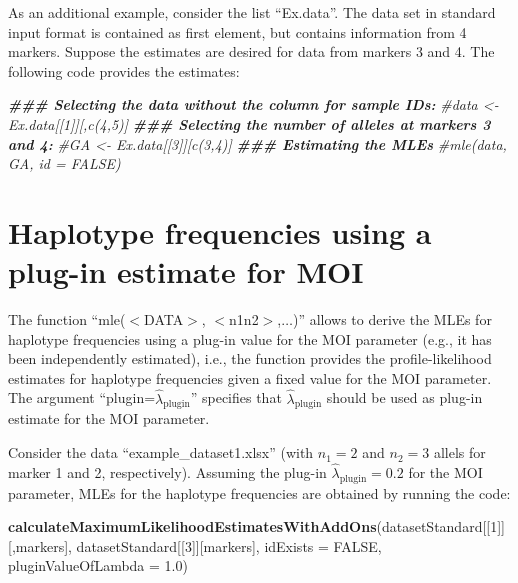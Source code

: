 \documentclass[
]{article}
\newenvironment{Shaded}{\begin{snugshade}}{\end{snugshade}}
\newcommand{\AttributeTok}[1]{\textcolor[rgb]{0.13,0.29,0.53}{#1}}
\newcommand{\CommentTok}[1]{\textcolor[rgb]{0.56,0.35,0.01}{\textit{#1}}}
\newcommand{\ConstantTok}[1]{\textcolor[rgb]{0.56,0.35,0.01}{#1}}
\newcommand{\DecValTok}[1]{\textcolor[rgb]{0.00,0.00,0.81}{#1}}
\newcommand{\DocumentationTok}[1]{\textcolor[rgb]{0.56,0.35,0.01}{\textbf{\textit{#1}}}}
\newcommand{\FloatTok}[1]{\textcolor[rgb]{0.00,0.00,0.81}{#1}}
\newcommand{\FunctionTok}[1]{\textcolor[rgb]{0.13,0.29,0.53}{\textbf{#1}}}
\newcommand{\NormalTok}[1]{#1}
\begin{document}
As an additional example, consider the list ``Ex.data''. The data set in
standard input format is contained as first element, but contains
information from 4 markers. Suppose the estimates are desired for data
from markers 3 and 4. The following code provides the estimates:

\begin{Shaded}
\begin{Highlighting}[]
\DocumentationTok{\#\#\# Selecting the data without the column for sample IDs:}
\CommentTok{\#data \textless{}{-} Ex.data[[1]][,c(4,5)]}
\DocumentationTok{\#\#\# Selecting the number of alleles at markers 3 and 4:}
\CommentTok{\#GA \textless{}{-} Ex.data[[3]][c(3,4)]}
\DocumentationTok{\#\#\# Estimating the MLEs}
\CommentTok{\#mle(data, GA, id = FALSE)}
\end{Highlighting}
\end{Shaded}

\section*{Haplotype frequencies using a plug-in estimate for MOI}

The function ``mle(\(<\)DATA\(>\), \(<\)n1n2\(>\),\(\ldots\))'' allows
to derive the MLEs for haplotype frequencies using a plug-in value for
the MOI parameter (e.g., it has been independently estimated), i.e., the
function provides the profile-likelihood estimates for haplotype
frequencies given a fixed value for the MOI parameter. The argument
``plugin=\(\hat \lambda_\text{plugin}\)'' specifies that
\(\hat \lambda_\text{plugin}\) should be used as plug-in estimate for
the MOI parameter.

Consider the data ``example\_dataset1.xlsx'' (with \(n_1=2\) and
\(n_2=3\) allels for marker 1 and 2, respectively). Assuming the plug-in
\(\hat \lambda_\text{plugin} = 0.2\) for the MOI parameter, MLEs for the
haplotype frequencies are obtained by running the code:

\begin{Shaded}
\begin{Highlighting}[]
\FunctionTok{calculateMaximumLikelihoodEstimatesWithAddOns}\NormalTok{(datasetStandard[[}\DecValTok{1}\NormalTok{]][,markers], datasetStandard[[}\DecValTok{3}\NormalTok{]][markers], }\AttributeTok{idExists =} \ConstantTok{FALSE}\NormalTok{, }\AttributeTok{pluginValueOfLambda =} \FloatTok{1.0}\NormalTok{)}
\end{Highlighting}
\end{Shaded}
\end{document}
